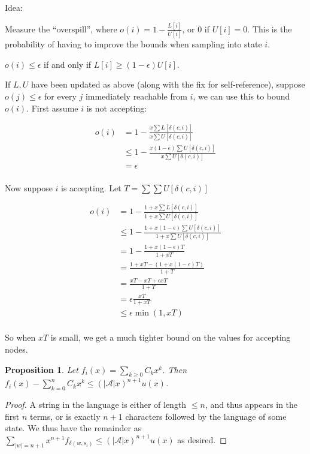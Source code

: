 \documentclass[a4paper]{book}
\newtheorem{proposition}{Proposition}
\begin{document}
Idea:

Measure the ``overspill'', where \(o(i) = 1 - \frac{L[i]}{U[i]}\), or \(0\) if \(U[i] = 0\).
This is the probability of having to improve the bounds when sampling into state \(i\).

\(o(i) \leq \epsilon\) if and only if \(L[i] \geq (1 - \epsilon)U[i]\).

If \(L, U\) have been updated as above (along with the fix for self-reference),
suppose \(o(j) \leq \epsilon\) for every \(j\) immediately reachable from \(i\),
we can use this to bound \(o(i)\).
First assume \(i\) is not accepting:

\begin{align*}
o(i) &= 1 - \frac{x \sum L[\delta(c, i)]}{x \sum U[\delta(c, i)]} \\
&\leq 1 - \frac{x (1 - \epsilon) \sum U[\delta(c, i)]}{x \sum U[\delta(c, i)]} \\
&= \epsilon\\
\end{align*}

Now suppose \(i\) is accepting.
Let \(T = \sum \sum U[\delta(c, i)]\)

\begin{align*}
o(i) &= 1 - \frac{1 + x \sum L[\delta(c, i)]}{1 + x \sum U[\delta(c, i)]} \\
&\leq 1 - \frac{1 + x (1 - \epsilon) \sum U[\delta(c, i)]}{1 + x \sum U[\delta(c, i)]} \\
&= 1 - \frac{1 + x (1 - \epsilon) T}{1 + x T}\\
&= \frac{1 + x T - (1 + x (1 - \epsilon) T)}{1 + T}\\
&= \frac{x T - x T + \epsilon x T}{1 + T}\\
&= \epsilon \frac{x T}{1 + x T}\\
&\leq \epsilon \min(1, xT)\\
\end{align*}

So when \(xT\) is small,
we get a much tighter bound on the values for accepting nodes.

\begin{proposition}
Let \(f_i(x) = \sum\limits_{k \geq 0} C_k x^k\).
Then \(f_i(x) - \sum\limits_{k = 0}^n C_k x^k \leq {(|\mathcal{A}|x)}^{n + 1} u(x)\).
\end{proposition}

\begin{proof}
A string in the language is either of length \(\leq n\),
and thus appears in the first \(n\) terms,
or is exactly \(n + 1\) characters followed by the language of some state.
We thus have the remainder as \(\sum\limits_{|w| = n + 1} x^{n + 1} f_{\delta(w, s_i)} \leq {(|\mathcal{A}|x)}^{n + 1} u(x)\) as desired.
\end{proof}
\end{document}
